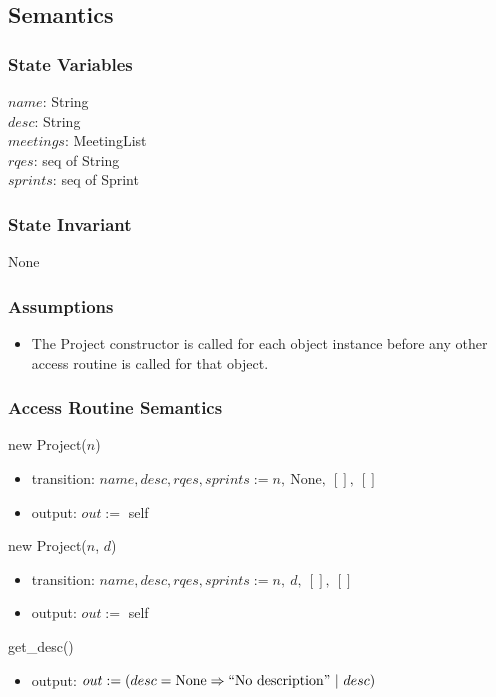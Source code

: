 \documentclass[12pt, titlepage]{article}
\begin{document}
\subsection*{Semantics}
\subsubsection*{State Variables}
$name$: String\\
$desc$: String\\
$meetings$: MeetingList\\
$rqes$: seq of String\\
$sprints$: seq of Sprint

\subsubsection*{State Invariant}
None

\subsubsection*{Assumptions}
\begin{itemize}
  \item The Project constructor is called for each object instance before any other access routine is called for that object.
\end{itemize}

\subsubsection*{Access Routine Semantics}
\noindent new Project($n$)
\begin{itemize}
    \item transition: $name, desc, rqes, sprints := n,\ \text{None},\ [],\ []$
    \item output: $out :=$ self
\end{itemize}

\noindent new Project($n$, $d$)
\begin{itemize}
    \item transition: $name, desc, rqes, sprints := n,\ d,\ [],\ []$
    \item output: $out :=$ self
\end{itemize}

\noindent get\_desc()
\begin{itemize}
    \item output: $out := (desc = \text{None} \Rightarrow ``\text{No description}"\ |\ desc)$
\end{itemize}
\end{document}
